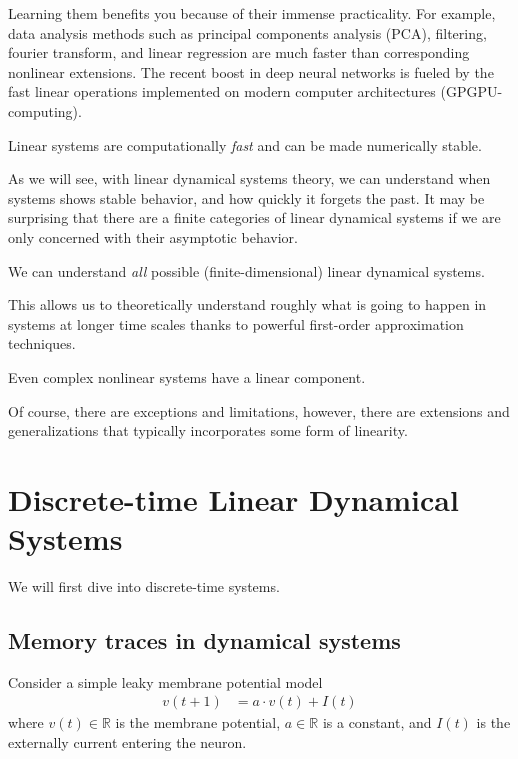 \documentclass[a4paper,11pt]{exam}
\newcounter{ct}
\newcommand{\field}[1]{\ensuremath{\mathbb{#1}}}
\newcommand{\reals}{\field{R}}
\begin{document}
Learning them benefits you because of their immense practicality.
For example, data analysis methods such as principal components analysis (PCA), filtering, fourier transform, and linear regression are much faster than corresponding nonlinear extensions.
The recent boost in deep neural networks is fueled by the fast linear operations implemented on modern computer architectures (GPGPU-computing).
\begin{tcolorbox}[colback=black!1!,title=Saves you time and the planet]
    Linear systems are computationally \emph{fast} and can be made numerically stable.
\end{tcolorbox}
As we will see, with linear dynamical systems theory, we can understand when systems shows stable behavior, and how quickly it forgets the past.
It may be surprising that there are a finite categories of linear dynamical systems if we are only concerned with their asymptotic behavior.
\begin{tcolorbox}[colback=black!1!,title=Easy asymptotic theory]
    We can understand \emph{all} possible (finite-dimensional) linear dynamical systems.
\end{tcolorbox}
This allows us to theoretically understand roughly what is going to happen in systems at longer time scales thanks to powerful first-order approximation techniques.
\begin{tcolorbox}[colback=black!1!,title=Linearize (locally)]
    Even complex nonlinear systems have a linear component.
\end{tcolorbox}
Of course, there are exceptions and limitations, however, there are extensions and generalizations that typically incorporates some form of linearity.

\section{Discrete-time Linear Dynamical Systems}
We will first dive into discrete-time systems.

\subsection{Memory traces in dynamical systems}
Consider a simple leaky membrane potential model
\begin{align}\label{eq:dtlds:LIF:def}
	v(t+1) &= a \cdot v(t) + I(t)
\end{align}
where $v(t) \in \reals$ is the membrane potential, $a \in \reals$ is a constant, and $I(t)$ is the externally current entering the neuron.
\end{document}

